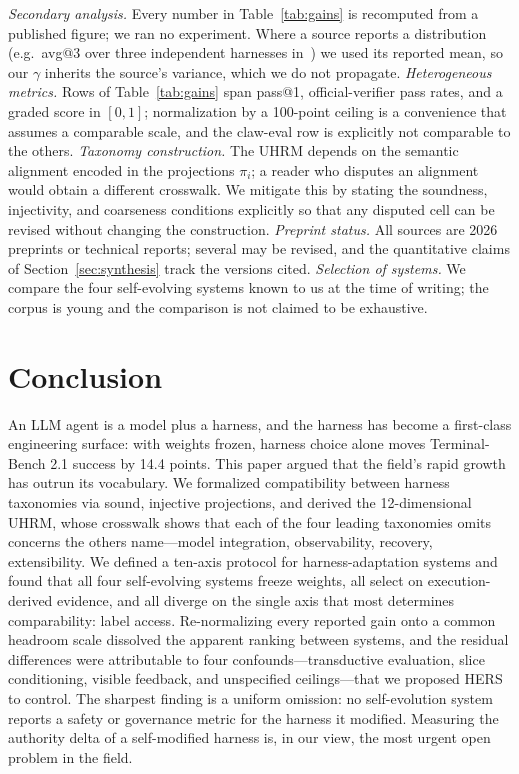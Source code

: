 \documentclass[conference]{IEEEtran}
\begin{document}
\textit{Secondary analysis.} Every number in Table~\ref{tab:gains} is recomputed from a published figure; we ran no experiment. Where a source reports a distribution (e.g.\ avg@3 over three independent harnesses in~\cite{b6}) we used its reported mean, so our $\gamma$ inherits the source's variance, which we do not propagate. \textit{Heterogeneous metrics.} Rows of Table~\ref{tab:gains} span pass@1, official-verifier pass rates, and a graded score in $[0,1]$; normalization by a 100-point ceiling is a convenience that assumes a comparable scale, and the claw-eval row is explicitly not comparable to the others. \textit{Taxonomy construction.} The UHRM depends on the semantic alignment encoded in the projections $\pi_i$; a reader who disputes an alignment would obtain a different crosswalk. We mitigate this by stating the soundness, injectivity, and coarseness conditions explicitly so that any disputed cell can be revised without changing the construction. \textit{Preprint status.} All sources are 2026 preprints or technical reports; several may be revised, and the quantitative claims of Section~\ref{sec:synthesis} track the versions cited. \textit{Selection of systems.} We compare the four self-evolving systems known to us at the time of writing; the corpus is young and the comparison is not claimed to be exhaustive.

\section{Conclusion}

An LLM agent is a model plus a harness, and the harness has become a first-class engineering surface: with weights frozen, harness choice alone moves Terminal-Bench 2.1 success by 14.4 points. This paper argued that the field's rapid growth has outrun its vocabulary. We formalized compatibility between harness taxonomies via sound, injective projections, and derived the 12-dimensional UHRM, whose crosswalk shows that each of the four leading taxonomies omits concerns the others name---model integration, observability, recovery, extensibility. We defined a ten-axis protocol for harness-adaptation systems and found that all four self-evolving systems freeze weights, all select on execution-derived evidence, and all diverge on the single axis that most determines comparability: label access. Re-normalizing every reported gain onto a common headroom scale dissolved the apparent ranking between systems, and the residual differences were attributable to four confounds---transductive evaluation, slice conditioning, visible feedback, and unspecified ceilings---that we proposed HERS to control. The sharpest finding is a uniform omission: no self-evolution system reports a safety or governance metric for the harness it modified. Measuring the authority delta of a self-modified harness is, in our view, the most urgent open problem in the field.
\end{document}
